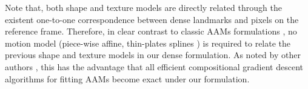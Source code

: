 Note that, both shape and texture models are directly related through the existent one-to-one correspondence between dense landmarks and pixels on the reference frame. Therefore, in clear contrast to classic AAMs formulations \cite{Cootes2001, Matthews2004}, no motion model (piece-wise affine, thin-plates splines \cite{Bookstein1989}) is required to relate the previous shape and texture models in our dense formulation. As noted by other authors \cite{Amberg2009, Tzimiropoulos2014}, this has the advantage that all efficient compositional gradient descent algorithms for fitting AAMs \cite{Papandreou2008, Matthews2004, Amberg2009, Tzimiropoulos2013, Alabort2014} become exact under our formulation. 

